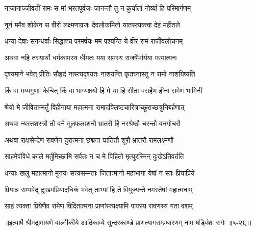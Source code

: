 \twolineshloka
{नाजानाज्जीवतीं रामः स मां भरतपूर्वजः}
{जानन्तौ तु न कुर्यातां नोर्व्यां हि परिमार्गणम्} %

\twolineshloka
{नूनं ममैव शोकेन स वीरो लक्ष्मणाग्रजः}
{देवलोकमितो यातस्त्यक्त्वा देहं महीतले} %

\twolineshloka
{धन्या देवाः सगन्धर्वाः सिद्धाश्च परमर्षयः}
{मम पश्यन्ति ये वीरं रामं राजीवलोचनम्} %

\twolineshloka
{अथवा नहि तस्यार्थो धर्मकामस्य धीमतः}
{मया रामस्य राजर्षेर्भार्यया परमात्मनः} %

\twolineshloka
{दृश्यमाने भवेत् प्रीतिः सौहृदं नास्त्यदृश्यतः}
{नाशयन्ति कृतघ्नास्तु न रामो नाशयिष्यति} %

\twolineshloka
{किं वा मय्यगुणाः केचित् किं वा भाग्यक्षयो हि मे}
{या हि सीता वरार्हेण हीना रामेण भामिनी} %

\twolineshloka
{श्रेयो मे जीवितान्मर्तुं विहीनाया महात्मना}
{रामादक्लिष्टचारित्राच्छूराच्छत्रुनिबर्हणात्} %

\twolineshloka
{अथवा न्यस्तशस्त्रौ तौ वने मूलफलाशनौ}
{भ्रातरौ हि नरश्रेष्ठौ चरन्तौ वनगोचरौ} %

\twolineshloka
{अथवा राक्षसेन्द्रेण रावणेन दुरात्मना}
{छद्मना घातितौ शूरौ भ्रातरौ रामलक्ष्मणौ} %

\twolineshloka
{साहमेवंविधे काले मर्तुमिच्छामि सर्वतः}
{न च मे विहितो मृत्युरस्मिन् दुःखेऽतिवर्तति} %

\twolineshloka
{धन्याः खलु महात्मानो मुनयः सत्यसम्मताः}
{जितात्मानो महाभागा येषां न स्तः प्रियाप्रिये} %

\twolineshloka
{प्रियान्न सम्भवेद् दुःखमप्रियादधिकं भवेत्}
{ताभ्यां हि ते वियुज्यन्ते नमस्तेषां महात्मनाम्} %

\twolineshloka
{साहं त्यक्ता प्रियेणैव रामेण विदितात्मना}
{प्राणांस्त्यक्ष्यामि पापस्य रावणस्य गता वशम्} %


॥इत्यार्षे श्रीमद्रामायणे वाल्मीकीये आदिकाव्ये सुन्दरकाण्डे प्राणत्यागसम्प्रधारणम् नाम षड्विंशः सर्गः ॥५-२६॥
